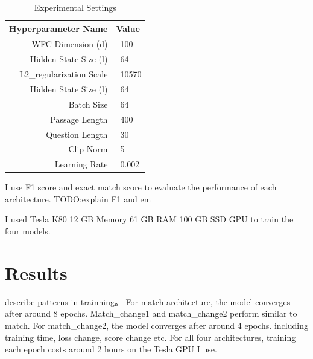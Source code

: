 \documentclass[modernstyle,12pt]{sjsuthesis}
\theoremstyle{definition}
\begin{document}
\begin{table}[htbp]\centering
  \caption{Experimental Settings}
  \label{tab:dataset}
  \begin{tabular}{|r|l|} \hline
    Hyperparameter Name& Value \\ \hline\hline
    WFC Dimension (d) & \ 100 \\
    Hidden State Size (l) & \ 64 \\
    L2\_regularization Scale & \ 10570\\
    Hidden State Size (l) & \ 64\\
    Batch Size & \ 64\\
    Passage Length & \ 400\\
    Question Length & \ 30\\
    Clip Norm & \ 5\\
    Learning Rate & \ 0.002 \\ \hline
  \end{tabular}
\end{table}


I use F1 score and exact match score to evaluate the performance of each architecture. TODO:explain F1 and em

I used Tesla K80 12 GB Memory 61 GB RAM 100 GB SSD GPU to train the four models.

\section{Results}



describe patterns in trainning。 For match architecture, the model converges after around 8 epochs. Match\_change1 and match\_change2 perform similar to match. For match\_change2, the model converges after around 4 epochs.  including training time, loss change, score change etc. For all four architectures, training each epoch costs around 2 hours on the Tesla GPU I use.
\end{document}
